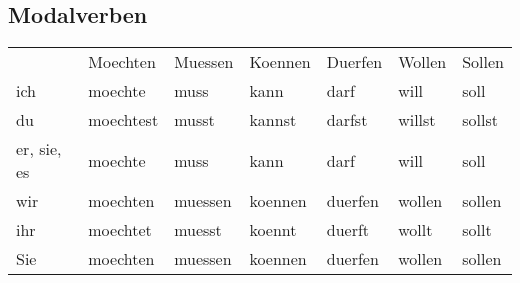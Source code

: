 \begin{appendix}
 
 \section{Modalverben}
 
 \begin{tabular}{l l l l l l l}
  & \gls{Moechten} & \gls{Muessen} & \gls{Koennen} & \gls{Duerfen} & \gls{Wollen} & \gls{Sollen} \\
  ich & moechte & muss & kann & darf & will & soll \\
  du & moechtest & musst & kannst & darfst & willst & sollst \\
  er, sie, es & moechte & muss & kann & darf & will & soll \\
  wir & moechten & muessen & koennen & duerfen & wollen & sollen \\
  ihr & moechtet & muesst & koennt & duerft & wollt & sollt \\
  Sie & moechten & muessen & koennen & duerfen & wollen & sollen \\
 \end{tabular}

 
 
\end{appendix}